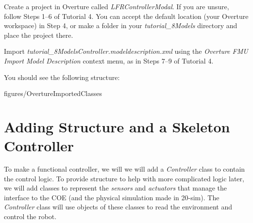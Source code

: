 \documentclass[11pt,a4paper]{../tutorial}
\begin{document}
\begin{instructions}
\item Create a project in Overture called \emph{LFRControllerModal}. If you are unsure, follow Steps 1--6 of Tutorial 4. You can accept the default location (your Overture workspace) in Step 4, or make a folder in your \emph{tutorial\_8\pathsep{}Models} directory and place the project there.

\item Import \emph{tutorial\_8\pathsep{}Models\pathsep{}Controller.modeldescription.xml} using the \emph{Overture FMU \menusep Import Model Description} context menu, as in Steps 7--9 of Tutorial 4.

    You should see the following structure:

    \begin{annotation}[width=0.25\linewidth,trim=0 300 535 0,clip]{figures/OvertureImportedClasses}
    \end{annotation}

\end{instructions}

\section{Adding Structure and a Skeleton Controller}

To make a functional controller, we will we will add a \emph{Controller} class to contain the control logic. To provide structure to help with more complicated logic later, we will add classes to represent the \emph{sensors} and \emph{actuators} that manage the interface to the COE (and the physical simulation made in 20-sim). The \emph{Controller} class will use objects of these classes to read the environment and control the robot.
\end{document}
